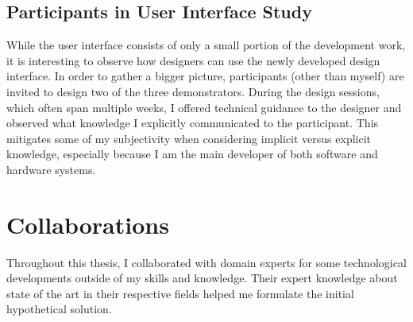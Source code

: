 \subsection{Participants in User Interface Study}

While the user interface consists of only a small portion of the development work, it is interesting to observe how designers can use the newly developed design interface. In order to gather a bigger picture, participants (other than myself) are invited to design two of the three demonstrators. During the design sessions, which often span multiple weeks, I offered technical guidance to the designer and observed what knowledge I explicitly communicated to the participant. This mitigates some of my subjectivity when considering implicit versus explicit knowledge, especially because I am the main developer of both software and hardware systems. 

\section{Collaborations}

Throughout this thesis, I collaborated with domain experts for some technological developments outside of my skills and knowledge. Their expert knowledge about state of the art in their respective fields helped me formulate the initial hypothetical solution. 

